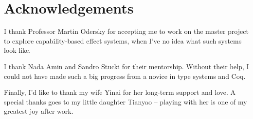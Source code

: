 \section*{\centering Acknowledgements}

I thank Professor Martin Odersky for accepting me to work on the
master project to explore capability-based effect systems, when I've
no idea what such systems look like.

I thank Nada Amin and Sandro Stucki for their mentorship. Without
their help, I could not have made such a big progress from a novice in
type systems and Coq.

Finally, I'd like to thank my wife Yinai for her long-term support and
love. A special thanks goes to my little daughter Tianyao -- playing
with her is one of my greatest joy after work.
